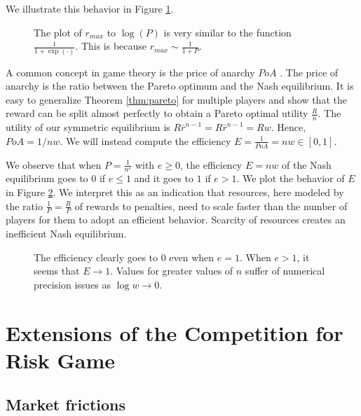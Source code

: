 \documentclass[preprint,12pt,authoryear]{elsarticle}
\theoremstyle{definition}
\begin{document}
We illustrate this behavior in Figure \ref{fig:cutoff-asymptotic}.

\begin{figure}[htbp]
    \centering
    
    \caption{The plot of $r_{max}$ to $\log(P)$ is very similar to the function $\frac{1}{1 + \exp(\cdot)}$. This is because $r_{max} \sim \frac{1}{1+P}$.}
    \label{fig:cutoff-asymptotic}
\end{figure}



A common concept in game theory is the price of anarchy $PoA$ \citep{koutsoupias1999worst}. The price of anarchy is the ratio between the Pareto optimum and the Nash equilibrium. It is easy to generalize Theorem \ref{thm:pareto} for multiple players and show that the reward can be split almost perfectly to obtain a Pareto optimal utility $\frac{R}{n}$. The utility of our symmetric equilibrium is $R \bar r ^ {n-1} = R \bar r ^ {n-1} = R w$. Hence, $PoA = 1 / n w$. We will instead compute the efficiency $E = \frac{1}{PoA} = n w \in [0,1]$.


We observe that when $P = \frac{1}{n^e}$ with $e \ge 0$, the efficiency $E = n w$ of the Nash equilibrium goes to $0$ if $e \le 1$ and it goes to $1$ if $e > 1$. We plot the behavior of $E$ in Figure \ref{fig:efficiency}.
We interpret this as an indication that resources, here modeled by the ratio $\frac{1}{P} = \frac{R}{P}$ of rewards to penalties, need to scale faster than the number of players for them to adopt an efficient behavior. Scarcity of resources creates an inefficient Nash equilibrium.

\begin{figure}[htbp]
    \centering
    
    \caption{The efficiency clearly goes to $0$ even when $e = 1$. When $e>1$, it seems that $E \rightarrow 1$. Values for greater values of $n$ suffer of numerical precision issues as $\log w \rightarrow 0$.}
    \label{fig:efficiency}
\end{figure}

\section{Extensions of the Competition for Risk Game}


\subsection{Market frictions}
\end{document}
